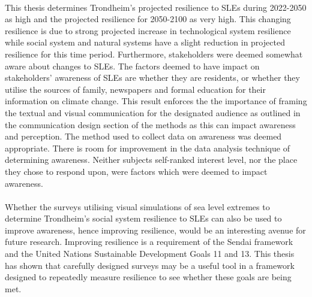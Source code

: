 \paragraph{}
This thesis determines Trondheim's projected resilience to SLEs during 2022-2050 as high and the projected resilience for 2050-2100 as very high. This changing resilience is due to strong projected increase in technological system resilience while social system and natural systems have a slight reduction in projected resilience for this time period. Furthermore, stakeholders were deemed somewhat aware about changes to SLEs. The factors deemed to have impact on stakeholders' awareness of SLEs are whether they are residents, or whether they utilise the sources of family, newspapers and formal education for their information on climate change. This result enforces the the importance of framing the textual and visual communication for the designated audience as outlined in the communication design section of the methods as this can impact awareness and perception.  The method used to collect data on awareness was deemed appropriate. There is room for improvement in the data analysis technique of determining awareness. Neither subjects self-ranked interest level, nor the place they chose to respond upon, were factors which were deemed to impact awareness.
\paragraph{}



Whether the surveys utilising visual simulations of sea level extremes to determine Trondheim's social system resilience to SLEs can also be used to improve awareness, hence improving resilience, would be an interesting avenue for future research. Improving resilience is a requirement of the Sendai framework and the United Nations Sustainable Development Goals 11 and 13. This thesis has shown that carefully designed surveys may be a useful tool in a framework designed to repeatedly measure resilience to see whether these goals are being met.


